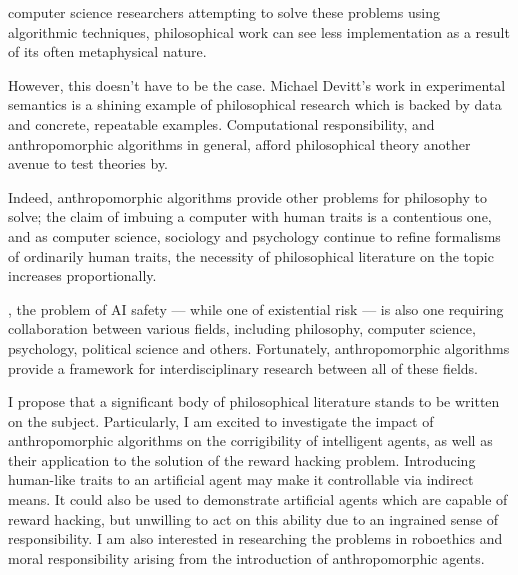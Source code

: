  computer science researchers attempting to solve these problems using algorithmic techniques, philosophical work can see less implementation as a result of its often metaphysical nature.\par

However, this doesn't have to be the case. Michael Devitt's work in experimental semantics\cite{experimental_semantics} is a shining example of philosophical research which is backed by data and concrete, repeatable examples. Computational responsibility, and anthropomorphic algorithms in general, afford philosophical theory another avenue to test theories by.\par

Indeed, anthropomorphic algorithms provide other problems for philosophy to solve; the claim of imbuing a computer with human traits is a contentious one, and as computer science, sociology and psychology continue to refine formalisms of ordinarily human traits, the necessity of philosophical literature on the topic increases proportionally.\par
, the problem of AI safety --- while one of existential risk --- is also one requiring collaboration between various fields, including philosophy, computer science, psychology, political science and others. Fortunately, anthropomorphic algorithms provide a framework for interdisciplinary research between all of these fields.\par

I propose that a significant body of philosophical literature stands to be written on the subject. Particularly, I am excited to investigate the impact of anthropomorphic algorithms on the corrigibility of intelligent agents, as well as their application to the solution of the reward hacking problem. Introducing human-like traits to an artificial agent may make it controllable via indirect means. It could also be used to demonstrate artificial agents which are capable of reward hacking, but unwilling to act on this ability due to an ingrained sense of responsibility. I am also interested in researching the problems in roboethics and moral responsibility arising from the introduction of anthropomorphic agents.\par

